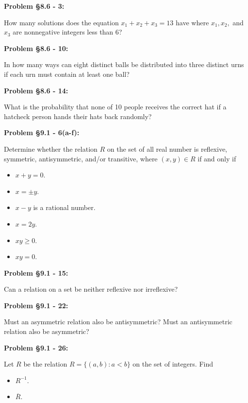 \documentclass{article}
\newenvironment{problem}[1]
    {\begin{mdframed}[default]
    \textbf{Problem #1:}
    }
    {\end{mdframed}
    }
\begin{document}
\begin{problem}{\S 8.6 - 3}
How many solutions does the equation $x_1 + x_2 + x_3 = 13$ have where $x_1, x_2,$ and $x_3$ are nonnegative integers less than 6?
\end{problem}


\begin{problem}{\S 8.6 - 10}
In how many ways can eight distinct balls be distributed into three distinct urns if each urn must contain at least one ball?
\end{problem}


\begin{problem}{\S 8.6 - 14}
What is the probability that none of 10 people receives the correct hat if a hatcheck person hands their hats back randomly?
\end{problem}


\begin{problem}{\S 9.1 - 6(a-f)}
Determine whether the relation $R$ on the set of all real number is reflexive, symmetric, antisymmetric, and/or transitive, where $(x,y) \in R$ if and only if
\begin{itemize}
    \item[(a)] $x+y = 0$.
    \item[(b)] $x = \pm y$.
    \item[(c)] $x-y$ is a rational number.
    \item[(d)] $x = 2y$.
    \item[(e)] $xy \geq 0$.
    \item[(f)] $xy = 0$.
\end{itemize}
\end{problem}


\begin{problem}{\S 9.1 - 15}
Can a relation on a set be neither reflexive nor irreflexive?
\end{problem}


\begin{problem}{\S 9.1 - 22}
Must an asymmetric relation also be antisymmetric? Must an antisymmetric relation also be asymmetric?
\end{problem}


\begin{problem}{\S 9.1 - 26}
Let $R$ be the relation $R = \{ (a,b) : a < b \}$ on the set of integers. Find
\begin{itemize}
    \item[(a)] $R^{-1}$.
    \item[(b)] $\overline{R}$.
\end{itemize}
\end{problem}
\end{document}
